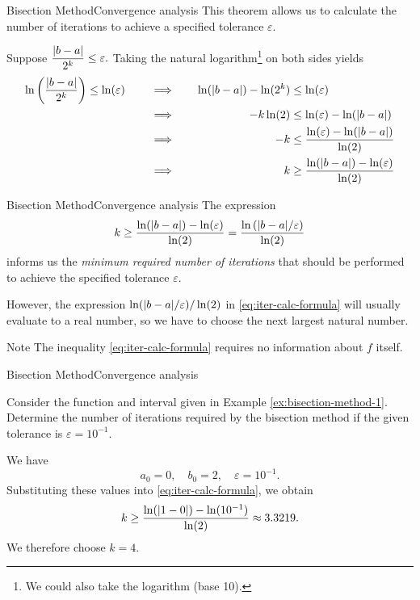 \documentclass[12pt,aspectratio=169,envcountset]{beamer}
\DeclarePairedDelimiter{\abs}{\lvert}{\rvert}
\begin{document}
\begin{frame}{Bisection Method}{Convergence analysis}
  This theorem allows us to calculate the number of iterations to achieve a
  specified tolerance $\varepsilon$.

  Suppose
  $
    \dfrac{\abs{b - a}}{2^k} \leq \varepsilon.
  $
  Taking the natural logarithm\footnote{We could also take the logarithm
  (base 10).} on both sides yields
  \begin{alignat*}{4}
    \ln\left(\frac{\abs{b - a}}{2^k}\right) &\leq \ln(\varepsilon) 
    \quad &
    &\implies \quad&
    \ln(\abs{b - a}) - \ln(2^k) &\leq \ln(\varepsilon) \\
    &&&\implies & -k\ln(2) &\leq \ln(\varepsilon) - \ln(\abs{b - a}) \\
    &&&\implies & -k &\leq \frac{\ln(\varepsilon) - \ln(\abs{b - a})}{\ln(2)}
    \\
    &&&\implies & k &\geq \frac{\ln(\abs{b - a}) - \ln(\varepsilon)}{\ln(2)}
  \end{alignat*}
\end{frame}

\begin{frame}{Bisection Method}{Convergence analysis}
  The expression
  \begin{equation} \label{eq:iter-calc-formula}
    k \geq \frac{\ln(\abs{b - a}) - \ln(\varepsilon)}{\ln(2)}
    = \frac{\ln\left(\abs{b - a}/\varepsilon\right)}{\ln(2)}
  \end{equation}
  informs us the \emph{minimum required number of iterations} that should be
  performed to achieve the specified tolerance $\varepsilon$.

  However, the expression $\ln(\abs{b - a}/\varepsilon)/\ln(2)$ in
  \eqref{eq:iter-calc-formula}
  will usually evaluate to a real number,
  so we have to choose the next largest natural number.

  \begin{block}{Note}
    The inequality \eqref{eq:iter-calc-formula} requires no information about $f$
    itself.
  \end{block}
\end{frame}

\begin{frame}{Bisection Method}{Convergence analysis}
  \begin{example}
    Consider the function and interval given in Example
    \ref{ex:bisection-method-1}.
    Determine the number of iterations required by the bisection method if the
    given tolerance is $\varepsilon = 10^{-1}$.
  \end{example}
  We have
  \[
    a_0 = 0, \quad
    b_0 = 2, \quad
    \varepsilon = 10^{-1}.
  \]
  Substituting these values into \eqref{eq:iter-calc-formula}, we obtain
  \[
    k \geq \frac{\ln(\abs{1 - 0}) - \ln(10^{-1})}{\ln(2)} \approx 3.3219.
  \]
  We therefore choose $k = 4$.
\end{frame}
\end{document}
